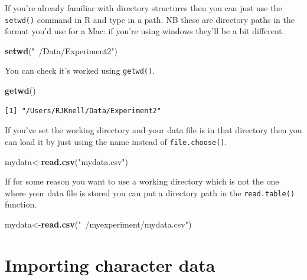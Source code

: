 \documentclass[
]{book}
\newenvironment{Shaded}{\begin{snugshade}}{\end{snugshade}}
\newcommand{\KeywordTok}[1]{\textcolor[rgb]{0.13,0.29,0.53}{\textbf{#1}}}
\newcommand{\NormalTok}[1]{#1}
\newcommand{\StringTok}[1]{\textcolor[rgb]{0.31,0.60,0.02}{#1}}
\begin{document}
If you're already familiar with directory structures then you can just use the \texttt{setwd()} command in R and type in a path. NB these are directory paths in the format you'd use for a Mac: if you're using windows they'll be a bit different.

\begin{Shaded}
\begin{Highlighting}[]
\KeywordTok{setwd}\NormalTok{(}\StringTok{"~/Data/Experiment2"}\NormalTok{)}
\end{Highlighting}
\end{Shaded}

You can check it's worked using \texttt{getwd()}.

\begin{Shaded}
\begin{Highlighting}[]
\KeywordTok{getwd}\NormalTok{()}
\end{Highlighting}
\end{Shaded}

\begin{verbatim}
[1] "/Users/RJKnell/Data/Experiment2"
\end{verbatim}

If you've set the working directory and your data file is in that directory then you can load it by just using the name instead of \texttt{file.choose()}.

\begin{Shaded}
\begin{Highlighting}[]
\NormalTok{mydata<-}\KeywordTok{read.csv}\NormalTok{(}\StringTok{"mydata.csv"}\NormalTok{)}
\end{Highlighting}
\end{Shaded}

If for some reason you want to use a working directory which is not the one where your data file is stored you can put a directory path in the \texttt{read.table()} function.

\begin{Shaded}
\begin{Highlighting}[]
\NormalTok{mydata<-}\KeywordTok{read.csv}\NormalTok{(}\StringTok{"~/myexperiment/mydata.csv"}\NormalTok{)}
\end{Highlighting}
\end{Shaded}

\hypertarget{importing-character-data}{%
\section{Importing character data}\label{importing-character-data}}
\end{document}
